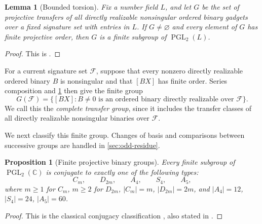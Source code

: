 \documentclass[11pt,letterpaper,onecolumn]{article}
\theoremstyle{plain}
\newtheorem{lemma}[lemma]{Lemma}
\newtheorem{proposition}[proposition]{Proposition}
\theoremstyle{definition}
\theoremstyle{remark}
\newcommand{\cF}{\mathcal F}
\newcommand{\PGL}{\operatorname{PGL}}
\begin{document}
	\begin{lemma}[Bounded torsion]
		\label{lem:bounded-torsion}
		Fix a number field \(L\), and let \(G\) be the set of projective
		transfers of all directly realizable nonsingular ordered
		binary gadgets over a fixed signature set with entries in \(L\).
		If \(G\ne\varnothing\) and every element of \(G\) has finite
		projective order, then \(G\) is a finite subgroup of
		\(\PGL_2(L)\).
	\end{lemma}
	
	\begin{proof}
		This is \cite[Lemma~5.2]{Liu2026DEQ2Holant}.
	\end{proof}
	
	For a current signature set \(\cF\), suppose that every nonzero directly
	realizable ordered binary \(B\) is nonsingular and that \([BX]\) has finite
	order.  Series composition and \cref{lem:bounded-torsion} then give the finite
	group
	\begin{equation}
		G(\cF)
		=\{[BX]:B\ne0\text{ is an ordered binary directly realizable over }\cF\}.
		\label{eq:complete-safe-group}
	\end{equation}
We call this the \emph{complete transfer group}, since it includes the
transfer classes of all directly realizable nonsingular binaries over \(\cF\).

We next classify this finite group. Changes of basis and comparisons
between successive groups are handled in \cref{sec:odd-residue}.
	
	\begin{proposition}[Finite projective binary groups]
		\label{prop:finite-pgl2-classification}
		Every finite subgroup of \(\PGL_2(\mathbb C)\) is conjugate to exactly one
		of the following types:
		\[
		C_m,\qquad D_{2m},\qquad A_4,\qquad S_4,\qquad A_5,
		\]
		where \(m\ge1\) for \(C_m\), \(m\ge2\) for \(D_{2m}\),
		\(|C_m|=m\), \(|D_{2m}|=2m\), and
		\(|A_4|=12\), \(|S_4|=24\), \(|A_5|=60\).
	\end{proposition}
	
	\begin{proof}
		This is the classical conjugacy classification
		\cite[Section~5.1]{Beardon1983}, also stated in
		\cite[Proposition~2.1]{Liu2026DEQ2Holant}.
	\end{proof}
	
\end{document}
